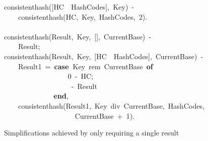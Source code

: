 \documentclass[runningheads,a4paper]{llncs}
\newcommand{\hlstd}[1]{\textcolor[rgb]{0,0,0}{#1}}
\newcommand{\hlnum}[1]{\textcolor[rgb]{0.69,0.49,0}{#1}}
\newcommand{\hlopt}[1]{\textcolor[rgb]{0,0,0}{#1}}
\newcommand{\hlkwa}[1]{\textcolor[rgb]{0,0,0}{\bf{#1}}}
\newcommand{\hlkwd}[1]{\textcolor[rgb]{0,0,0.51}{#1}}
\begin{document}
\begin{figure}
\noindent
\ttfamily
\hlkwd{consistent\textunderscore hash}\hlstd{}\hlopt{({[}}\hlstd{HC\ \textbar \ HashCodes}\hlopt{{]},\ }\hlstd{Key}\hlopt{)\ {-}}\hspace*{\fill}\\
\hlstd{}\hlstd{\ \ \ \ }\hlstd{}\hlkwd{consistent\textunderscore hash}\hlstd{}\hlopt{(}\hlstd{HC}\hlopt{,\ }\hlstd{Key}\hlopt{,\ }\hlstd{HashCodes}\hlopt{,\ }\hlstd{}\hlnum{2}\hlstd{}\hlopt{).}\hspace*{\fill}\\
\hlstd{}\hspace*{\fill}\\
\hlkwd{consistent\textunderscore hash}\hlstd{}\hlopt{(}\hlstd{Result}\hlopt{,\ }\hlstd{\textunderscore Key}\hlopt{,\ {[}{]},\ }\hlstd{\textunderscore CurrentBase}\hlopt{)\ {-}}\hspace*{\fill}\\
\hlstd{}\hlstd{\ \ \ \ }\hlstd{Result}\hlopt{;}\hspace*{\fill}\\
\hlstd{}\hlkwd{consistent\textunderscore hash}\hlstd{}\hlopt{(}\hlstd{Result}\hlopt{,\ }\hlstd{Key}\hlopt{,\ {[}}\hlstd{HC\ \textbar \ HashCodes}\hlopt{{]},\ }\hlstd{CurrentBase}\hlopt{)\ {-}}\hspace*{\fill}\\
\hlstd{}\hlstd{\ \ \ \ }\hlstd{Result1\ }\hlopt{=\ }\hlstd{}\hlkwa{case\ }\hlstd{Key\ rem\ CurrentBase\ }\hlkwa{of}\hspace*{\fill}\\
\hlstd{}\hlstd{\ \ \ \ \ \ \ \ \ \ \ \ \ \ \ \ \ \ }\hlstd{}\hlnum{0\ }\hlstd{}\hlopt{{-}\ }\hlstd{HC}\hlopt{;}\hspace*{\fill}\\
\hlstd{}\hlstd{\ \ \ \ \ \ \ \ \ \ \ \ \ \ \ \ \ \ }\hlstd{\textunderscore \ }\hlopt{{-}\ }\hlstd{Result\hspace*{\fill}\\
}\hlstd{\ \ \ \ \ \ \ \ \ \ \ \ \ \ }\hlstd{}\hlkwa{end}\hlstd{}\hlopt{,}\hspace*{\fill}\\
\hlstd{}\hlstd{\ \ \ \ }\hlstd{}\hlkwd{consistent\textunderscore hash}\hlstd{}\hlopt{(}\hlstd{Result1}\hlopt{,\ }\hlstd{Key\ div\ CurrentBase}\hlopt{,\ }\hlstd{HashCodes}\hlopt{,}\hspace*{\fill}\\
\hlstd{}\hlstd{\ \ \ \ \ \ \ \ \ \ \ \ \ \ \ \ \ \ \ \ }\hlstd{CurrentBase\ }\hlopt{+\ }\hlstd{}\hlnum{1}\hlstd{}\hlopt{).}\hspace*{\fill}\\
\mbox{}
\normalfont
\normalsize
\caption{Simplifications achieved by only requiring a single result}
\label{fig:code:new-one-result}
\end{figure}
\end{document}
